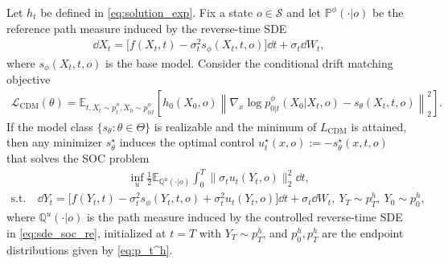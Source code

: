 






\begin{proposition}
\label{prop:cdm_solves_soc_re}
Let $h_t$ be defined in \eqref{eq:solution_exp}.
Fix a state $o \in\mathcal S$ and let $\mathbb P^\phi(\cdot|o)$ be the reference path measure induced by the reverse-time SDE 
\begin{align*}
    \dd X_t
    =
    \bigl[
        f(X_t,t)-\sigma_t^2 s_\phi(X_t,t,o)
    \bigr]\dd t
    +
    \sigma_t\dd W_t,
\end{align*}
where $s_\phi(X_t,t,o)$ is the base model.
Consider the conditional drift matching objective
\begin{align*}
\mathcal{L}_{\mathrm{CDM}}(\theta)
=
\mathbb E_{t, X_t\sim p_t^\phi, X_0\sim p_{0|t}^\phi}
\left[
h_0(X_0,o)
\left\|
\nabla_x\log p_{0|t}^\phi(X_0|X_t,o)
-
s_\theta(X_t,t,o)
\right\|_2^2
\right].
\end{align*}
If the model class $\{s_\theta : \theta \in \Theta\}$ is realizable and the minimum of $L_{\mathrm{CDM}}$ is attained, then any minimizer $s_\theta^\star$ induces the optimal control 
$u_t^\star(x,o) := -s_\theta^\star(x,t,o)$
that solves the SOC problem
\begin{align}
    & ~ \quad \quad \quad
    \quad \quad \quad \quad \quad \inf_u 
    \frac12
    \mathbb E_{\mathbb Q^u(\cdot|o)}
    \int_0^T
    \|\sigma_t
    u_t(Y_t,o)\|_2^2\dd t, 
    \label{eq:oj_soc_re}
    \\
    \text{s.t.} & ~ 
    \dd Y_t
    =
    \bigl[
        f(Y_t,t)-\sigma_t^2 s_\phi(Y_t,t,o) + \sigma_t^2 u_t(Y_t,o)
    \bigr]\dd t
    +
    \sigma_t\dd W_t ,
    ~ Y_T \sim p_T^h, ~Y_0 \sim p_0^h,
    \label{eq:sde_soc_re}
\end{align}
where $\mathbb Q^u(\cdot|o)$ is the path measure induced by the controlled reverse-time SDE in \eqref{eq:sde_soc_re}, initialized at $t=T$ with $Y_T\sim p_T^h$, and $p_0^h,p_T^h$ are the endpoint distributions given by \eqref{eq:p_t^h}.
\end{proposition}

